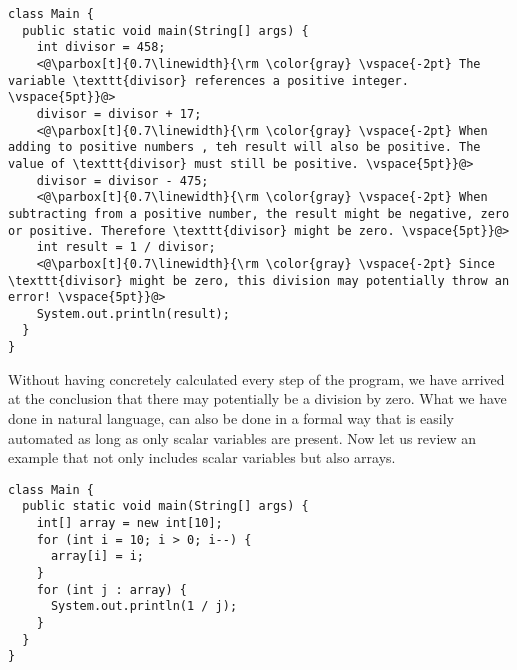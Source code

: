\vspace{2mm}

\begin{adjustbox}{center}
\begin{lstlisting}
class Main {
  public static void main(String[] args) {
    int divisor = 458;
    <@\parbox[t]{0.7\linewidth}{\rm \color{gray} \vspace{-2pt} The variable \texttt{divisor} references a positive integer. \vspace{5pt}}@>
    divisor = divisor + 17;
    <@\parbox[t]{0.7\linewidth}{\rm \color{gray} \vspace{-2pt} When adding to positive numbers , teh result will also be positive. The value of \texttt{divisor} must still be positive. \vspace{5pt}}@>
    divisor = divisor - 475;
    <@\parbox[t]{0.7\linewidth}{\rm \color{gray} \vspace{-2pt} When subtracting from a positive number, the result might be negative, zero or positive. Therefore \texttt{divisor} might be zero. \vspace{5pt}}@>
    int result = 1 / divisor;
    <@\parbox[t]{0.7\linewidth}{\rm \color{gray} \vspace{-2pt} Since \texttt{divisor} might be zero, this division may potentially throw an error! \vspace{5pt}}@>
    System.out.println(result);
  }
}
\end{lstlisting}
\end{adjustbox}
\vspace{2mm}

\noindent Without having concretely calculated every step of the program, we have arrived at the conclusion that there may potentially be a division by zero. What we have done in natural language, can also be done in a formal way that is easily automated \cite{cousot1977} as long as only scalar variables are present. Now let us review an example that not only includes scalar variables but also arrays.


\vspace{2mm}

\begin{adjustbox}{center}
\begin{lstlisting}
class Main {
  public static void main(String[] args) {
    int[] array = new int[10];
    for (int i = 10; i > 0; i--) {
      array[i] = i;
    }
    for (int j : array) {
      System.out.println(1 / j);
    }
  }
}
\end{lstlisting}
\end{adjustbox}
\vspace{2mm}


